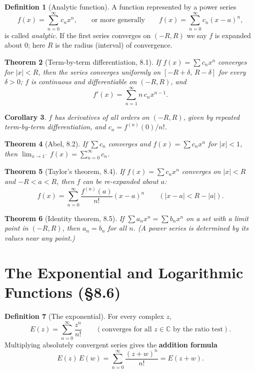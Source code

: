 \documentclass[11pt]{article}
\theoremstyle{definition}
\newtheorem{definition}{Definition}[section]
\theoremstyle{plain}
\newtheorem{theorem}[definition]{Theorem}
\newtheorem{corollary}[definition]{Corollary}
\newcommand{\C}{\mathbb{C}}
\newcommand{\abs}[1]{\left\lvert #1 \right\rvert}
\renewcommand{\to}{\longrightarrow}
\begin{document}
\begin{definition}[Analytic function]
A function represented by a power series
\[
   f(x)=\sum_{n=0}^{\infty} c_n x^n,
   \qquad\text{or more generally}\qquad
   f(x)=\sum_{n=0}^{\infty} c_n (x-a)^n,
\]
is called \emph{analytic}. If the first series converges on $(-R,R)$ we say
$f$ is expanded about $0$; here $R$ is the radius (interval) of convergence.
\end{definition}

\begin{theorem}[Term-by-term differentiation, 8.1]
If $f(x)=\sum c_n x^n$ converges for $\abs{x}<R$, then the series converges
\emph{uniformly} on $[-R+\delta,\,R-\delta]$ for every $\delta>0$; $f$ is
continuous and differentiable on $(-R,R)$, and
\[
   f'(x)=\sum_{n=1}^{\infty} n\,c_n x^{n-1}.
\]
\end{theorem}

\begin{corollary}
$f$ has derivatives of \emph{all} orders on $(-R,R)$, given by repeated
term-by-term differentiation, and $c_n = f^{(n)}(0)/n!$.
\end{corollary}

\begin{theorem}[Abel, 8.2]
If $\sum c_n$ converges and $f(x)=\sum c_n x^n$ for $\abs{x}<1$, then
$\displaystyle\lim_{x\to 1^-} f(x)=\sum_{n=0}^{\infty} c_n$.
\end{theorem}

\begin{theorem}[Taylor's theorem, 8.4]
If $f(x)=\sum c_n x^n$ converges on $\abs{x}<R$ and $-R<a<R$, then $f$ can be
re-expanded about $a$:
\[
   f(x)=\sum_{n=0}^{\infty}\frac{f^{(n)}(a)}{n!}(x-a)^n
   \qquad (\abs{x-a}<R-\abs{a}).
\]
\end{theorem}

\begin{theorem}[Identity theorem, 8.5]
If $\sum a_n x^n=\sum b_n x^n$ on a set with a limit point in $(-R,R)$, then
$a_n=b_n$ for all $n$. (A power series is determined by its values near any point.)
\end{theorem}

\section{The Exponential and Logarithmic Functions (\S8.6)}

\begin{definition}[The exponential]
For every complex $z$,
\[
   E(z)=\sum_{n=0}^{\infty}\frac{z^n}{n!}
   \qquad(\text{converges for all }z\in\C\text{ by the ratio test}).
\]
Multiplying absolutely convergent series gives the \textbf{addition formula}
\[
   E(z)\,E(w)=\sum_{n=0}^{\infty}\frac{(z+w)^n}{n!}=E(z+w).
\]
\end{definition}
\end{document}
